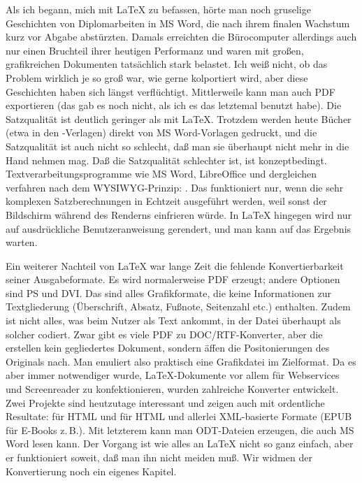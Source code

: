 \documentclass[11pt,table]{scrreprt}
\begin{document}
Als ich begann, mich mit \LaTeX{} zu befassen, hörte man noch gruselige Geschichten von Diplomarbeiten in MS Word, die nach ihrem finalen Wachstum kurz vor Abgabe abstürzten. Damals erreichten die Bürocomputer allerdings auch nur einen Bruchteil ihrer heutigen Performanz und waren mit großen, grafikreichen Dokumenten tatsächlich stark belastet. Ich weiß nicht, ob das Problem wirklich je so groß war, wie gerne kolportiert wird, aber diese Geschichten haben sich längst verflüchtigt. Mittlerweile kann man auch PDF exportieren (das gab es noch nicht, als ich es das letztemal benutzt habe). Die Satzqualität ist deutlich geringer als mit \LaTeX. Trotzdem werden heute Bücher (etwa in den -Verlagen) direkt von MS Word-Vorlagen gedruckt, und die Satzqualität ist auch nicht so schlecht, daß man sie überhaupt nicht mehr in die Hand nehmen mag. Daß die Satzqualität schlechter ist, ist konzeptbedingt. Textverarbeitungsprogramme wie MS Word, LibreOffice und dergleichen verfahren nach dem WYSIWYG-Prinzip: . Das funktioniert nur, wenn die sehr komplexen Satzberechnungen in Echtzeit ausgeführt werden, weil sonst der Bildschirm während des Renderns einfrieren würde. In \LaTeX{} hingegen wird nur auf ausdrückliche Benutzeranweisung gerendert, und man kann auf das Ergebnis warten.

Ein weiterer Nachteil von \LaTeX{} war lange Zeit die fehlende Konvertierbarkeit seiner Ausgabeformate. Es wird normalerweise PDF erzeugt; andere Optionen sind PS und DVI. Das sind alles Grafikformate, die keine Informationen zur Textgliederung (Überschrift, Absatz, Fußnote, Seitenzahl etc.) enthalten. Zudem ist nicht alles, was beim Nutzer als Text ankommt, in der Datei überhaupt als solcher codiert. Zwar gibt es viele PDF zu DOC/RTF-Konverter, aber die erstellen kein gegliedertes Dokument, sondern äffen die Positonierungen des Originals nach. Man emuliert also praktisch eine Grafikdatei im Zielformat. Da es aber immer notwendiger wurde, \LaTeX{}-Dokumente vor allem für Webservices und Screenreader zu konfektionieren, wurden zahlreiche  Konverter entwickelt. Zwei Projekte sind heutzutage interessant und zeigen auch mit \archbib{} ordentliche Resultate:
\Paket{\LaTeXML{}} für HTML und  für HTML und allerlei XML-basierte Formate (EPUB für E-Books z.\,B.). Mit letzterem kann man ODT-Dateien erzeugen, die auch MS Word lesen kann. Der Vorgang ist wie alles an \LaTeX{} nicht so ganz einfach, aber er funktioniert soweit, daß man ihn nicht meiden muß. Wir widmen der Konvertierung noch ein eigenes Kapitel.
\end{document}
